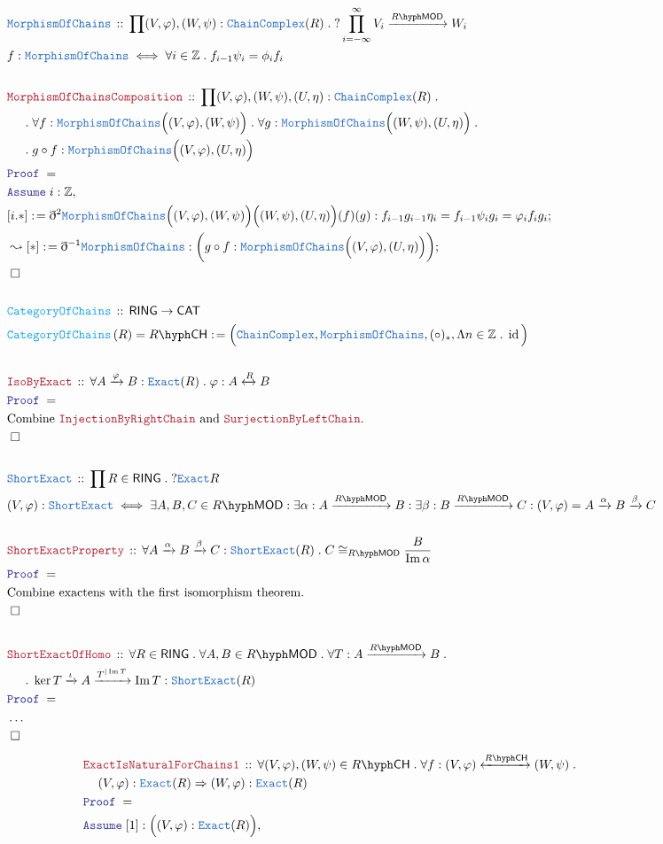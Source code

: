 \documentclass[12pt]{scrartcl}
\newcommand{\TYPE}[1]{\textcolor{NavyBlue}{\mathtt{#1}}}
\newcommand{\FUNC}[1]{\textcolor{Cerulean}{\mathtt{#1}}}
\newcommand{\LOGIC}[1]{\textcolor{Blue}{\mathtt{#1}}}
\newcommand{\THM}[1]{\textcolor{Maroon}{\mathtt{#1}}}
\renewcommand{\.}{\; . \;}
\newcommand{\de}{: \kern 0.1pc =}
\newcommand{\Act}[1]{\left(#1\right)}
\newcommand{\Theorem}[2]{& \THM{#1} \, :: \, #2 \\ & \Proof = \\ }
\newcommand{\DeclareType}[2]{& \TYPE{#1} \, :: \, #2 \\}
\newcommand{\DefineType}[3]{& #1 : \TYPE{#2} \iff #3 \\}
\newcommand{\DeclareFunc}[2]{& \FUNC{#1} \, :: \, #2 \\}
\newcommand{\DefineNamedFunc}[4]{&  \FUNC{#1}\Act{#2} = #3 \de #4 \\}
\newcommand{\NewLine}{\\ & \kern 1pc}
\newcommand{\Page}[1]{ \begin{align*} #1 \end{align*}   }
\newcommand{ \bd }{ \ByDef }
\newcommand{\NoProof}{ & \ldots \\ \EndProof}
\newcommand{\Int}{\mathbb{Z} }
\DeclareMathOperator*{\id}{id}
\DeclareMathOperator*{\im}{Im}
\newcommand{\Conclude}[3]{& #1 \de #2 : #3; \\}
\newcommand{\DeriveConclude}[3]{& \leadsto #1 \de #2 : #3 ; \\}
\newcommand{\Assume}[2]{& \LOGIC{Assume} \; #1 : #2, \\}
\newcommand{\QED}{\; \square}
\newcommand{\EndProof}{& \QED \\}
\newcommand{\ByDef}{\eth}
\newcommand{\Proof}{\LOGIC{Proof} \; }
\newcommand{\Arrow}[1]{\xrightarrow{#1}}
\newcommand{\ToIso}[1]{\xleftrightarrow{#1}}
\newcommand{\CAT}{\mathsf{CAT}}
\newcommand{\LMOD}[1]{#1\hyph\mathsf{MOD}}
\newcommand{\RING}{\mathsf{RING}}
\newcommand{\Exact}{\TYPE{Exact}}
\newcommand{\ShortExact}{\TYPE{ShortExact}}
\newcommand{\CH}[1]{#1\hyph\mathsf{CH}}
\begin{document}
\Page{
	\DeclareType{MorphismOfChains}{\prod (V,\varphi),(W,\psi) : \TYPE{ChainComplex}(R) \. ?\prod^\infty_{i=-\infty} V_i \Arrow{\LMOD{R}} W_i }
	\DefineType{f}{MorphismOfChains}{ \forall i \in \Int \. f_{i-1}\psi_{i} = \phi_{i}f_{i}  }
	\\
	\Theorem{MorphismOfChainsComposition}{
		\prod (V,\varphi),(W,\psi),(U,\eta) : \TYPE{ChainComplex}(R) \. 
		\NewLine \. \forall f : \TYPE{MorphismOfChains}\Big((V,\varphi),(W,\psi)\Big) \. 
		\forall g : \TYPE{MorphismOfChains}\Big((W,\psi),(U,\eta)\Big)	\.
		\NewLine \. g \circ f : \TYPE{MorphismOfChains}\Big((V,\varphi),(U,\eta)\Big) 
	}
	\Assume{i}{\Int}
	\Conclude{[i.*]}{ \bd^2 \TYPE{MorphismOfChains}\Big((V,\varphi),(W,\psi)\Big)\Big((W,\psi),(U,\eta)\Big)(f)(g)}
	{
		f_{i-1}g_{i-1}\eta_i = 
		f_{i-1}\psi_i g_{i} =
		\varphi_i f_{i} g_{i} 
	}
	\DeriveConclude{[*]}{\bd^{-1} \TYPE{MorphismOfChains}}{\bigg(g \circ f : \TYPE{MorphismOfChains}\Big((V,\varphi),(U,\eta)\Big)\bigg)} 
	\EndProof
	\\
	\DeclareFunc{CategoryOfChains}{\RING \to \CAT}
	\DefineNamedFunc{CategoryOfChains}{R}{\CH{R}}{\Big( \TYPE{ChainComplex},\TYPE{MorphismOfChains},(\circ)_*, \Lambda n \in \Int \. \id \Big)}
	\\
	\Theorem{IsoByExact}{ \forall A \Arrow{\varphi} B : \Exact(R) \. \varphi : A \ToIso{R} B }
	&\text{Combine $\THM{InjectionByRightChain}$ and $\THM{SurjectionByLeftChain}$.} \\
	\EndProof
	\\
	\DeclareType{ShortExact}{\prod R \in \RING \. ?\Exact{R}}
	\DefineType{(V,\varphi)}{ShortExact}{
		\exists A,B,C \in \LMOD{R} : 
		\exists \alpha : A \Arrow{\LMOD{R}} B : 
		\exists \beta : B \Arrow{\LMOD{R}} C :
		(V,\varphi) = A \Arrow{\alpha} B \Arrow{\beta} C                           
	}
	\\
	\Theorem{ShortExactProperty}{\forall A \Arrow{\alpha} B \Arrow{\beta} C : \ShortExact(R) \. C \cong_{\LMOD{R}} \frac{B}{\im \alpha}}
	& \text{Combine exactens with the first isomorphism theorem.} \\
	\EndProof
	\\
	\Theorem{ShortExactOfHomo}{\forall R \in \RING \. \forall A,B \in \LMOD{R} \. \forall T : A \Arrow{\LMOD{R}} B \. 
		\NewLine \. \ker T \Arrow{\iota} A \Arrow{T^{|\im T}} \im T : \ShortExact(R)}
	\NoProof
}\Page{
	\Theorem{ExactIsNaturalForChains1}{\forall (V,\varphi),(W,\psi) \in \CH{R} \. \forall f : (V,\varphi) \ToIso{\CH{R}} (W,\psi) \. 
		\NewLine (V,\varphi) : \Exact(R) \Rightarrow (W,\varphi)  : \Exact(R)}
	\Assume{[1]}{\Big( (V,\varphi) : \Exact(R) \Big)}
}
\end{document}
